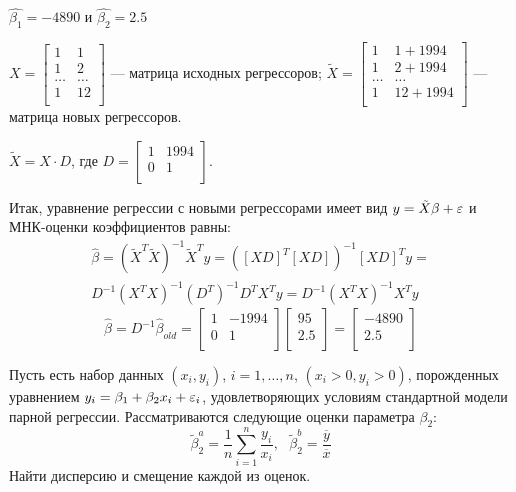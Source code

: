 \documentclass[pdftex,11pt,openany]{book}\usepackage[]{graphicx}\usepackage[]{color}
\begin{document}
\begin{solution}
$\hat{\beta_1} = -4890$ и $\hat{\beta_2} = 2.5$

$X = \begin{bmatrix}
1 & 1 \\
1 & 2 \\
\ldots & \ldots \\
1 & 12 \\
\end{bmatrix}$ --- матрица исходных регрессоров; $\tilde{X} = \begin{bmatrix}
1 & 1+1994\\
1 & 2+1994 \\
\ldots & \ldots \\
1 & 12+1994 \\
\end{bmatrix}$ --- матрица новых регрессоров.

$\tilde{X} = X \cdot D$, где $D = \begin{bmatrix}
1 & 1994 \\
0 & 1 \\
\end{bmatrix}$.

Итак, уравнение регрессии с новыми регрессорами имеет вид $y = \tilde{X}\beta + \varepsilon$ и МНК-оценки коэффициентов равны:
\begin{multline}
\hat{\beta} = \left( \tilde{X}^T \tilde{X} \right)^{-1} \tilde{X}^T y = \left( [XD]^T [XD] \right)^{-1} [XD]^T y = \\
D^{-1} (X^T X)^{-1} (D^T)^{-1} D^T X^T y = D^{-1} (X^T X)^{-1}X^T y 
\end{multline}
\[
\hat{\beta} = D^{-1}\hat{\beta}_{old} = \begin{bmatrix}
1 & -1994 \\
0 & 1 \\
\end{bmatrix} \begin{bmatrix}
95 \\
2.5 \\
\end{bmatrix} = \begin{bmatrix}
-4890 \\
2.5 \\
\end{bmatrix}
\]
\end{solution}

\begin{problem}
Пусть есть набор данных $(x_i, y_i)$, $i = 1, \ldots, n$, $(x_i>0, y_i>0)$, порожденных уравнением $y_i = \beta_1 + \beta_2 x_i + \varepsilon_i$, удовлетворяющих условиям стандартной модели парной регрессии.
Рассматриваются следующие оценки параметра $\beta_2$:
$$\tilde{\beta}_2^a = \frac{1}{n}\sum_{i=1}^n \frac{y_i}{x_i}, \text{ } \tilde{\beta}_2^b = \frac{\overline{y}}{\overline{x}}$$
Найти дисперсию и смещение каждой из оценок.
\end{problem}
\end{document}
